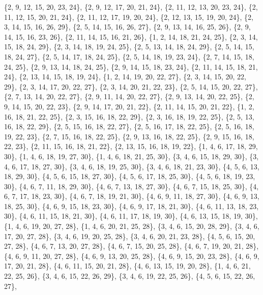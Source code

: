 \documentclass[11pt,a4paper]{article}
\begin{document}
{\{2, 9, 12, 15, 20, 23, 24\}, \{2, 9, 12, 17, 20, 21, 24\}, \{2, 11, 12, 13, 20, 23, 24\}, \{2, 11, 12, 15, 20, 21, 24\}, \{2, 11, 12, 17, 19, 20, 24\},
\{2, 12, 13, 15, 19, 20, 24\}, \{2, 3, 14, 15, 16, 26, 29\}, \{2, 5, 14, 15, 16, 26, 27\}, \{2, 9, 13, 14, 16, 25, 26\}, \{2, 9, 14, 15, 16, 23, 26\},
\{2, 11, 14, 15, 16, 21, 26\}, \{1, 2, 14, 18, 21, 24, 25\}, \{2, 3, 14, 15, 18, 24, 29\}, \{2, 3, 14, 18, 19, 24, 25\}, \{2, 5, 13, 14, 18, 24, 29\},
\{2, 5, 14, 15, 18, 24, 27\}, \{2, 5, 14, 17, 18, 24, 25\}, \{2, 5, 14, 18, 19, 23, 24\}, \{2, 7, 14, 15, 18, 24, 25\}, \{2, 9, 13, 14, 18, 24, 25\},
\{2, 9, 14, 15, 18, 23, 24\}, \{2, 11, 14, 15, 18, 21, 24\}, \{2, 13, 14, 15, 18, 19, 24\}, \{1, 2, 14, 19, 20, 22, 27\}, \{2, 3, 14, 15, 20, 22, 29\},
\{2, 3, 14, 17, 20, 22, 27\}, \{2, 3, 14, 20, 21, 22, 23\}, \{2, 5, 14, 15, 20, 22, 27\}, \{2, 7, 13, 14, 20, 22, 27\}, \{2, 9, 11, 14, 20, 22, 27\},
\{2, 9, 13, 14, 20, 22, 25\}, \{2, 9, 14, 15, 20, 22, 23\}, \{2, 9, 14, 17, 20, 21, 22\}, \{2, 11, 14, 15, 20, 21, 22\}, \{1, 2, 16, 18, 21, 22, 25\},
\{2, 3, 15, 16, 18, 22, 29\}, \{2, 3, 16, 18, 19, 22, 25\}, \{2, 5, 13, 16, 18, 22, 29\}, \{2, 5, 15, 16, 18, 22, 27\}, \{2, 5, 16, 17, 18, 22, 25\},
\{2, 5, 16, 18, 19, 22, 23\}, \{2, 7, 15, 16, 18, 22, 25\}, \{2, 9, 13, 16, 18, 22, 25\}, \{2, 9, 15, 16, 18, 22, 23\}, \{2, 11, 15, 16, 18, 21, 22\},
\{2, 13, 15, 16, 18, 19, 22\}, \{1, 4, 6, 17, 18, 29, 30\}, \{1, 4, 6, 18, 19, 27, 30\}, \{1, 4, 6, 18, 21, 25, 30\}, \{3, 4, 6, 15, 18, 29, 30\},
\{3, 4, 6, 17, 18, 27, 30\}, \{3, 4, 6, 18, 19, 25, 30\}, \{3, 4, 6, 18, 21, 23, 30\}, \{4, 5, 6, 13, 18, 29, 30\}, \{4, 5, 6, 15, 18, 27, 30\},
\{4, 5, 6, 17, 18, 25, 30\}, \{4, 5, 6, 18, 19, 23, 30\}, \{4, 6, 7, 11, 18, 29, 30\}, \{4, 6, 7, 13, 18, 27, 30\}, \{4, 6, 7, 15, 18, 25, 30\},
\{4, 6, 7, 17, 18, 23, 30\}, \{4, 6, 7, 18, 19, 21, 30\}, \{4, 6, 9, 11, 18, 27, 30\}, \{4, 6, 9, 13, 18, 25, 30\}, \{4, 6, 9, 15, 18, 23, 30\},
\{4, 6, 9, 17, 18, 21, 30\}, \{4, 6, 11, 13, 18, 23, 30\}, \{4, 6, 11, 15, 18, 21, 30\}, \{4, 6, 11, 17, 18, 19, 30\}, \{4, 6, 13, 15, 18, 19, 30\},
\{1, 4, 6, 19, 20, 27, 28\}, \{1, 4, 6, 20, 21, 25, 28\}, \{3, 4, 6, 15, 20, 28, 29\}, \{3, 4, 6, 17, 20, 27, 28\}, \{3, 4, 6, 19, 20, 25, 28\},
\{3, 4, 6, 20, 21, 23, 28\}, \{4, 5, 6, 15, 20, 27, 28\}, \{4, 6, 7, 13, 20, 27, 28\}, \{4, 6, 7, 15, 20, 25, 28\}, \{4, 6, 7, 19, 20, 21, 28\},
\{4, 6, 9, 11, 20, 27, 28\}, \{4, 6, 9, 13, 20, 25, 28\}, \{4, 6, 9, 15, 20, 23, 28\}, \{4, 6, 9, 17, 20, 21, 28\}, \{4, 6, 11, 15, 20, 21, 28\},
\{4, 6, 13, 15, 19, 20, 28\}, \{1, 4, 6, 21, 22, 25, 26\}, \{3, 4, 6, 15, 22, 26, 29\}, \{3, 4, 6, 19, 22, 25, 26\}, \{4, 5, 6, 15, 22, 26, 27\},
}
\end{document}
